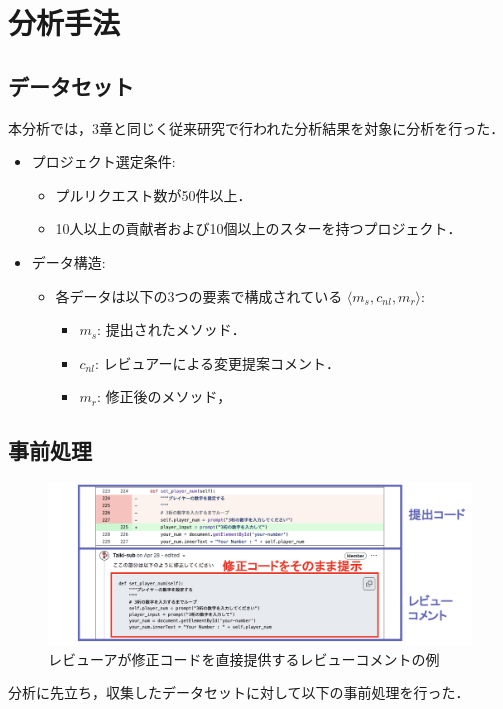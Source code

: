 \documentclass[11pt]{jreport}
\begin{document}
\section{分析手法}


\subsection {データセット}
本分析では，3章と同じく従来研究で行われた分析結果を対象に分析を行った．

\begin{itemize}
    \item プロジェクト選定条件:
    \begin{itemize}
        \item プルリクエスト数が50件以上．
        \item 10人以上の貢献者および10個以上のスターを持つプロジェクト．
    \end{itemize}
    \item データ構造:
    \begin{itemize}
        \item 各データは以下の3つの要素で構成されている $\langle m_s, c_{nl}, m_r \rangle$:
        \begin{itemize}
            \item $m_s$: 提出されたメソッド．
            \item $c_{nl}$: レビュアーによる変更提案コメント．
            \item $m_r$: 修正後のメソッド，
        \end{itemize}
    \end{itemize}


\end{itemize}

\subsection{事前処理}
\begin{figure}[htbp]
    \centering
    \includegraphics[width=0.8\linewidth]{@BSthesis2024_Akamatsu/Akamatsu_figs/review_comment.pdf}
    \caption{レビューアが修正コードを直接提供するレビューコメントの例}
    \label{fig:review-comment-example}
\end{figure}
分析に先立ち，収集したデータセットに対して以下の事前処理を行った．
\end{document}
